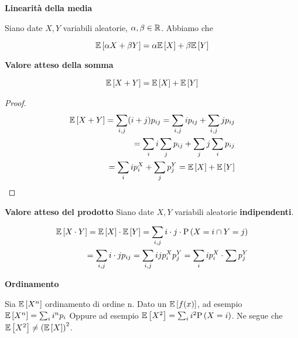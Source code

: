 \begin{defn}
    \textbf{Linearità della media}
    
    Siano date $ X,Y $ variabili aleatorie, $ \alpha ,\beta \in \mathbb{R} $. Abbiamo che
    
    \begin{equation*}
    \mathbb{E}\left[\alpha X + \beta Y\right] = \alpha \mathbb{E}\left[X\right] + \beta \mathbb{E}\left[Y\right]
    \end{equation*}
\end{defn}


\begin{defn}
    \textbf{Valore atteso della somma}
    
    \begin{equation}
    \begin{aligned}
    \mathbb{E}\left[X+Y\right] = \mathbb{E}\left[X\right] + \mathbb{E}\left[Y\right]
    \end{aligned}
    \end{equation}
    
    \begin{proof}
        \begin{equation*}
        \begin{aligned}
        \mathbb{E}\left[X+Y\right] = \sum_{i,j} (i+j)p_{ij} = \sum_{i,j} ip_{ij} + \sum_{i,j} jp_{ij} \\
        = \sum_i i \sum_j p_{ij} + \sum_j j \sum_i p_{ij} \\
        = \sum_i i p_i^X + \sum_j p_j^Y = \mathbb{E}\left[X\right] + \mathbb{E}\left[Y\right]
        \end{aligned}
        \end{equation*}
    \end{proof}

\end{defn}

\begin{defn}
    \textbf{Valore atteso del prodotto}
    Siano date $ X,Y $ variabili aleatorie \textbf{indipendenti}.
    
    \begin{equation*}
    \begin{aligned}
    \mathbb{E}\left[X \cdot Y\right] = \mathbb{E}\left[X\right] \cdot \mathbb{E}\left[Y\right] = \sum_{i,j} i \cdot j \cdot \text{P}\left(X = i \cap Y =j\right) \\
    = \sum_{i,j} i \cdot j p_{ij} = \sum_{i,j} ij p_i^X p_j^Y =  \sum_{i} i p_i^X \cdot \sum p_j^Y
    \end{aligned}
    \end{equation*}
\end{defn}


\begin{defn}
    \textbf{Ordinamento}
    
    Sia $\mathbb{E}\left[X^n\right]$ ordinamento di ordine n.
    Dato un $ \mathbb{E}\left[f(x)\right] $, ad esempio $ \mathbb{E}\left[X^n\right] = \sum_i i^n p_i$
    Oppure ad esempio $ \mathbb{E}\left[X^2\right] = \sum_i i^2 \text{P}\left(X = i\right)$. Ne segue che $ \mathbb{E}\left[X^2\right] \neq \left(\mathbb{E}\left[X\right]\right)^2$.	
\end{defn}


